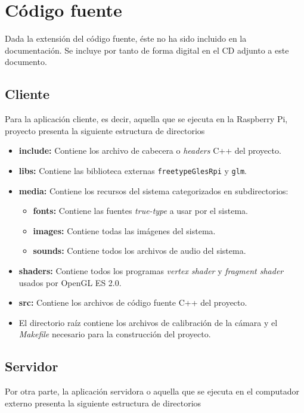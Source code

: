 \chapter{Código fuente}
\label{chap:anexo_codigo_fuente}

Dada la extensión del código fuente, éste no ha sido incluido en la documentación. Se incluye por
tanto de forma digital en el CD adjunto a este documento.

\section{Cliente}
Para la aplicación cliente, es decir, aquella que se ejecuta en la Raspberry Pi, proyecto presenta
la siguiente estructura de directorios

\begin{itemize}
\item \textbf{include:} Contiene los archivo de cabecera o \textit{headers} C++ del proyecto.
\item \textbf{libs:} Contiene las biblioteca externas \texttt{freetypeGlesRpi} y \texttt{glm}.
\item \textbf{media:} Contiene los recursos del sistema categorizados en subdirectorios:
  \begin{itemize}
    \item \textbf{fonts:} Contiene las fuentes \textit{true-type} a usar por el sistema.
    \item \textbf{images:} Contiene todas las imágenes del sistema.
    \item \textbf{sounds:} Contiene todos los archivos de audio del sistema.
  \end{itemize}
\item \textbf{shaders:} Contiene todos los programas \textit{vertex shader} y \textit{fragment
    shader} usados por OpenGL ES 2.0.
\item \textbf{src:} Contiene los archivos de código fuente C++ del proyecto.
\item El directorio raíz contiene los archivos de calibración de la cámara y el \textit{Makefile}
  necesario para la construcción del proyecto.
\end{itemize}

\section{Servidor}
Por otra parte, la aplicación servidora o aquella que se ejecuta en el computador externo presenta
la siguiente estructura de directorios

